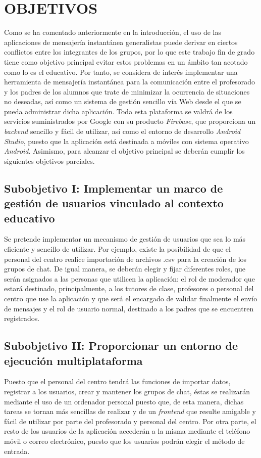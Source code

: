\documentclass{pre-tfg}
\begin{document}
\clearpage

\section{OBJETIVOS}
Como se ha comentado anteriormente en la introducción, el uso de las aplicaciones de mensajería instantánea generalistas puede derivar en ciertos conflictos entre los integrantes de los grupos, por lo que este trabajo fin de grado tiene como objetivo principal evitar estos problemas en un ámbito tan acotado como lo es el educativo. Por tanto, se considera de interés implementar una herramienta de mensajería instantánea para la comunicación entre el profesorado y los padres de los alumnos que trate de minimizar la ocurrencia de situaciones no deseadas, así como un sistema de gestión sencillo vía Web desde el que se pueda administrar dicha aplicación. Toda esta plataforma se valdrá de los servicios suministrados por Google con su producto \textit{Firebase}, que proporciona un \textit{backend} sencillo y fácil de utilizar, así como el entorno de desarrollo \textit{Android Studio}, puesto que la aplicación está destinada a móviles con sistema operativo \textit{Android}. Asimismo, para alcanzar el objetivo principal se deberán cumplir los siguientes objetivos parciales.

\subsection{Subobjetivo I: Implementar un marco de gestión de usuarios vinculado al contexto educativo}
Se pretende implementar un mecanismo de gestión de usuarios que sea lo más eficiente y sencillo de utilizar. Por ejemplo, existe la posibilidad de que el personal del centro realice importación de archivos .csv para la creación de los grupos de chat. De igual manera, se deberán elegir y fijar diferentes roles, que serán asignados a las personas que utilicen la aplicación: el rol de moderador que estará destinado, principalmente, a los tutores de clase, profesores o personal del centro que use la aplicación y que será el encargado de validar finalmente el envío de mensajes y el rol de usuario normal, destinado a los padres que se encuentren registrados.

\subsection{Subobjetivo II: Proporcionar un entorno de ejecución multiplataforma}
Puesto que el personal del centro tendrá las funciones de importar datos, registrar a los usuarios, crear y mantener los grupos de chat, éstas se realizarán mediante el uso de un ordenador personal puesto que, de esta manera, dichas tareas se tornan más sencillas de realizar y de un \textit{frontend} que resulte amigable y fácil de utilizar por parte del profesorado y personal del centro. Por otra parte, el resto de los usuarios de la aplicación accederán a la misma mediante el teléfono móvil o correo electrónico, puesto que los usuarios podrán elegir el método de entrada.
\end{document}
